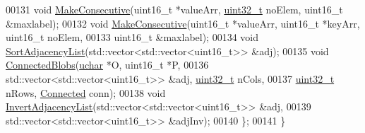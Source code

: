 \begin{DoxyCode}
00131   \textcolor{keywordtype}{void} \hyperlink{class_vision_1_1_segment_ad1d04c97a79dbbf1cf10e8587985e5e5}{MakeConsecutive}(uint16\_t *valueArr, \hyperlink{_soil_math_types_8h_a435d1572bf3f880d55459d9805097f62}{uint32\_t} noElem, uint16\_t &maxlabel);
00132   \textcolor{keywordtype}{void} \hyperlink{class_vision_1_1_segment_ad1d04c97a79dbbf1cf10e8587985e5e5}{MakeConsecutive}(uint16\_t *valueArr, uint16\_t *keyArr, uint16\_t noElem,
00133                        uint16\_t &maxlabel);
00134   \textcolor{keywordtype}{void} \hyperlink{class_vision_1_1_segment_a3d369e9d8b65dc96a3d4ac5ab8887960}{SortAdjacencyList}(std::vector<std::vector<uint16\_t>> &adj);
00135   \textcolor{keywordtype}{void} \hyperlink{class_vision_1_1_segment_a77bbb909901188d02a42c7df29186289}{ConnectedBlobs}(\hyperlink{_soil_math_types_8h_a65f85814a8290f9797005d3b28e7e5fc}{uchar} *O, uint16\_t *P,
00136                       std::vector<std::vector<uint16\_t>> &adj, \hyperlink{_soil_math_types_8h_a435d1572bf3f880d55459d9805097f62}{uint32\_t} nCols,
00137                       \hyperlink{_soil_math_types_8h_a435d1572bf3f880d55459d9805097f62}{uint32\_t} nRows, \hyperlink{class_vision_1_1_segment_a330240c08320e72270fac0aa83d5e27e}{Connected} conn);
00138   \textcolor{keywordtype}{void} \hyperlink{class_vision_1_1_segment_aac70975917e231c4879ff4f837ac9f73}{InvertAdjacencyList}(std::vector<std::vector<uint16\_t>> &adj,
00139                            std::vector<std::vector<uint16\_t>> &adjInv);
00140 \};
00141 \}
\end{DoxyCode}
